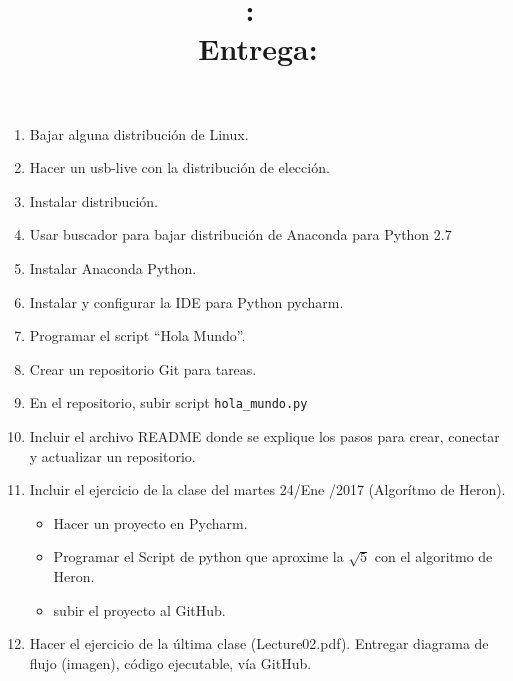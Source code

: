 \documentclass{article}
\title{
	\vspace{2in}
	\textmd{\textbf{\hmwkClass:\ \hmwkTitle}}\\
	\normalsize\vspace{0.1in}\small{Entrega: \hmwkDueDate}\\
	\vspace{0.1in}\large{\textit{\hmwkClassInstructor}}
	\vspace{3in}
}
\author{\textbf{\hmwkAuthorName}}
\date{} %
\begin{document}
	\maketitle

	\newpage



	\begin{enumerate}
		\item
			Bajar alguna distribuci\'on de Linux.
		\item
			Hacer un usb-live con la distribuci\'on de elecci\'on.
		\item
			Instalar distribuci\'on.
		\item
			Usar buscador para bajar distribuci\'on de Anaconda para 
			Python 2.7
		\item
			Instalar Anaconda Python.
		\item
			Instalar y configurar la IDE para Python pycharm.
		\item
			Programar el script ``Hola Mundo''.
		\item
			Crear un repositorio Git para tareas.
		\item
		      En el repositorio, subir script \verb|hola_mundo.py|
		\item
		      Incluir el archivo README donde se explique los pasos para
		      crear, conectar y actualizar un repositorio.
		\item
			Incluir el ejercicio de la clase del martes 24/Ene /2017 (Algor\'itmo de Heron).
			\begin{itemize}
				\item Hacer un proyecto en Pycharm.
				\item Programar el Script de python que aproxime la $\sqrt{5}$ con
					el algoritmo de Heron.
				\item
					subir el proyecto al GitHub.
			\end{itemize}
		\item
			Hacer el ejercicio de la última clase (Lecture02.pdf). 
			Entregar diagrama de flujo (imagen), código ejecutable, vía GitHub.
	\end{enumerate}
\end{document}
